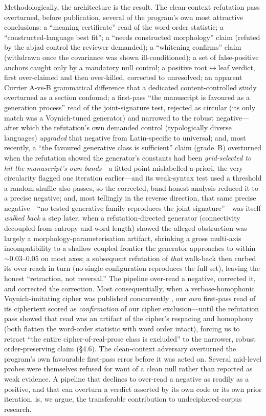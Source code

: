 \documentclass[11pt]{article}
\begin{document}
Methodologically, the architecture is the result. The clean-context refutation pass
overturned, before publication, several of the program's own most attractive
conclusions: a ``meaning certificate'' read of the word-order statistic; a
``constructed-language best fit''; a ``needs constructed morphology'' claim (refuted by
the abjad control the reviewer demanded); a ``whitening confirms'' claim (withdrawn
once the covariance was shown ill-conditioned); a set of false-positive anchors caught
only by a mandatory null control; a positive root$\leftrightarrow$leaf verdict, first
over-claimed and then over-killed, corrected to unresolved; an apparent Currier
A-vs-B grammatical difference that a dedicated content-controlled study overturned as a
section confound; a first-pass ``the manuscript is favoured as a
generation process'' read of the joint-signature test, rejected as circular (its only
match was a Voynich-tuned generator) and narrowed to the robust negative---after which
the refutation's own demanded control (typologically diverse languages) \emph{upgraded}
that negative from Latin-specific to universal; and, most recently, a ``the favoured
generative class is sufficient'' claim (grade~B) overturned when the refutation showed the
generator's constants had been \emph{grid-selected to hit the manuscript's own bands}---a
fitted point mislabelled a-priori, the very circularity flagged one iteration earlier---and
its weak-syntax test used a threshold a random shuffle also passes, so the corrected,
band-honest analysis reduced it to a precise negative; and, most tellingly in the reverse
direction, that same precise negative---``no tested generative family reproduces the joint
signature''---was itself \emph{walked back} a step later, when a refutation-directed
generator (connectivity decoupled from entropy and word length) showed the alleged
obstruction was largely a morphology-parameterisation artifact, shrinking a gross
multi-axis incompatibility to a shallow coupled frontier the generator approaches to within
$\sim\!0.03$--$0.05$ on most axes; a subsequent refutation of \emph{that} walk-back then
curbed its over-reach in turn (no single configuration reproduces the full set), leaving the
honest ``retraction, not reversal.'' The pipeline over-read a negative, corrected it, and
corrected the correction. Most consequentially, when a
verbose-homophonic Voynich-imitating cipher was published concurrently
\citep{greshko2025naibbe}, our \emph{own} first-pass read of its ciphertext scored as
\emph{confirmation} of our cipher exclusion---until the refutation pass showed that read was
an artifact of the cipher's respacing and homophony (both flatten the word-order statistic
with word order intact), forcing us to retract ``the entire cipher-of-real-prose class is
excluded'' to the narrower, robust order-preserving claim (\S4.6). The clean-context adversary
overturned the program's own favourable first-pass error before it was acted on. Several
mid-level
probes were themselves refused for want of a clean null rather than reported as weak
evidence. A pipeline that declines to over-read a negative as readily as a positive, and
that can overturn a
verdict asserted by its own code or its own prior iteration, is, we argue, the
transferable contribution to undeciphered-corpus research.
\end{document}
